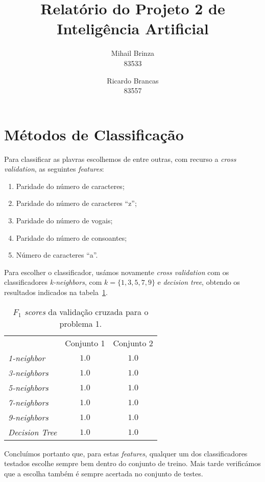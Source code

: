 \documentclass[a4paper,twocolumn]{article}
\title{\LARGE \textbf{Relatório do Projeto 2 de Inteligência Artificial}}
\author{Mihail Brinza \\ \scriptsize 83533 \normalsize \and Ricardo Brancas \\ \scriptsize 83557 \normalsize}
\begin{document}
    \maketitle

    \section{Métodos de Classificação}
    Para classificar as plavras escolhemos de entre outras, com recurso a \textit{cross validation}, as seguintes \textit{features}:
    \begin{enumerate}
        \item Paridade do número de caracteres;
        \item Paridade do número de caracteres ``z'';
        \item Paridade do número de vogais;
        \item Paridade do número de consoantes;
        \item Número de caracteres ``a''.
    \end{enumerate}
    Para escolher o classificador, usámos novamente \textit{cross validation} com os classificadores \textit{k-neighbors},
    com $ k = \{1,3,5,7,9\}$ e \textit{decision tree}, obtendo os resultados indicados na tabela~\ref{tab:cv1}.

    \begin{table}[ht]
        \centering
        \begin{tabular}{ l c c }
            & Conjunto 1 & Conjunto 2 \\
         \textit{1-neighbor}    & $1.0$ & $1.0$ \\
         \textit{3-neighbors}   & $1.0$ & $1.0$ \\
         \textit{5-neighbors}   & $1.0$ & $1.0$ \\
         \textit{7-neighbors}   & $1.0$ & $1.0$ \\
         \textit{9-neighbors}   & $1.0$ & $1.0$ \\
         \textit{Decision Tree} & $1.0$ & $1.0$
        \end{tabular}
        \caption{\textit{$F_1$ scores} da validação cruzada para o problema 1.}
        \label{tab:cv1}
    \end{table}

    Concluímos portanto que, para estas \textit{features}, qualquer um dos classificadores testados escolhe sempre bem dentro do
    conjunto de treino. Mais tarde verificámos que a escolha também é sempre acertada no conjunto de testes.
\end{document}
